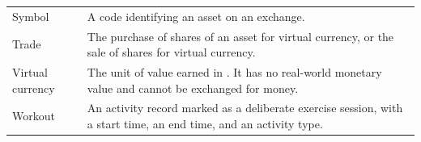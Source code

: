 \documentclass[12pt]{article}
\begin{document}
\begin{longtable}{>{\raggedright\arraybackslash}p{} p{}}
  Symbol & A code identifying an asset on an exchange. \\
  Trade                                              & The purchase of shares of an asset for virtual currency, or the sale of shares for virtual currency.                                                                    \\
  Virtual currency                                   & The unit of value earned in \progname{}. It has no real-world monetary value and cannot be exchanged for money.                                                         \\
  Workout                                            & An activity record marked as a deliberate exercise session, with a start time, an end time, and an activity type.                                                       \\


\end{longtable}
\end{document}
